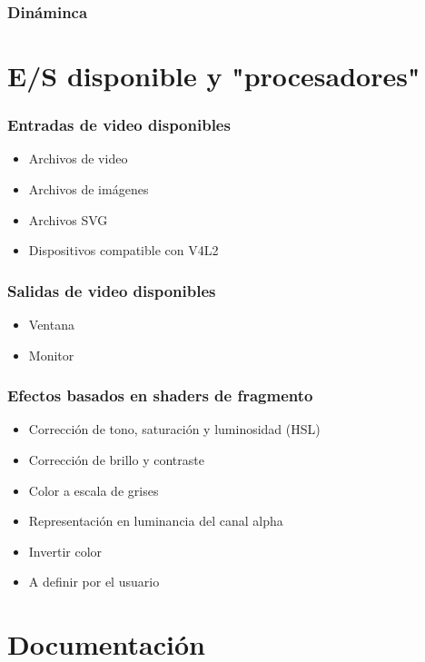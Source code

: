 \documentclass{beamer}
\begin{document}
\begin{frame} \frametitle{Dináminca}
\end{frame}

%
%
\section{E/S disponible y "procesadores"}

\begin{frame}[t] \frametitle{Entradas de video disponibles}
	\begin{itemize}
		\item{Archivos de video} \pause
		\item{Archivos de imágenes} \pause
		\item{Archivos SVG} \pause
		\item{Dispositivos compatible con V4L2}
	\end{itemize}
\end{frame}

\begin{frame}[t] \frametitle{Salidas de video disponibles}
	\begin{itemize}
		\item{Ventana}
		\item{Monitor}
	\end{itemize}
\end{frame}

\begin{frame}[t] \frametitle{Efectos basados en shaders de fragmento}
	\begin{itemize}
		\item{Corrección de tono, saturación y luminosidad (HSL)} \pause
		\item{Corrección de brillo y contraste} \pause
		\item{Color a escala de grises} \pause
		\item{Representación en luminancia del canal alpha}  \pause
		\item{Invertir color} \pause
		\item{A definir por el usuario}
	\end{itemize}
\end{frame}

%
%
\section{Documentación}
\end{document}
